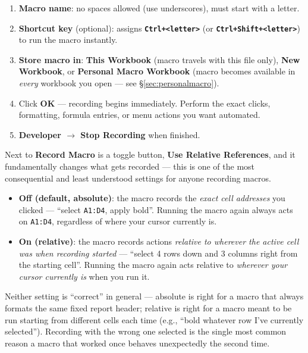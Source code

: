 \documentclass[11pt,a4paper]{article}
\newcommand{\key}[1]{\texttt{\colorbox{black!8}{\textbf{#1}}}}
\begin{document}
\begin{formulasyntax}
\begin{enumerate}
  \item \textbf{Macro name}: no spaces allowed (use underscores), must start with a letter.
  \item \textbf{Shortcut key} (optional): assigns \key{Ctrl+\textless letter\textgreater} (or \key{Ctrl+Shift+\textless letter\textgreater}) to run the macro instantly.
  \item \textbf{Store macro in}: \textbf{This Workbook} (macro travels with this file only), \textbf{New Workbook}, or \textbf{Personal Macro Workbook} (macro becomes available in \emph{every} workbook you open --- see \S\ref{sec:personalmacro}).
  \item Click \textbf{OK} --- recording begins immediately. Perform the exact clicks, formatting, formula entries, or menu actions you want automated.
  \item \textbf{Developer $\rightarrow$ Stop Recording} when finished.
\end{enumerate}
\end{formulasyntax}

\begin{pitfall}
Next to \textbf{Record Macro} is a toggle button, \textbf{Use Relative References}, and it fundamentally changes what gets recorded --- this is one of the most consequential and least understood settings for anyone recording macros.
\begin{itemize}
  \item \textbf{Off (default, absolute)}: the macro records the \emph{exact cell addresses} you clicked --- ``select \texttt{A1:D4}, apply bold''. Running the macro again always acts on \texttt{A1:D4}, regardless of where your cursor currently is.
  \item \textbf{On (relative)}: the macro records actions \emph{relative to wherever the active cell was when recording started} --- ``select 4 rows down and 3 columns right from the starting cell''. Running the macro again acts relative to \emph{wherever your cursor currently is} when you run it.
\end{itemize}
Neither setting is ``correct'' in general --- absolute is right for a macro that always formats the same fixed report header; relative is right for a macro meant to be run starting from different cells each time (e.g., ``bold whatever row I've currently selected''). Recording with the wrong one selected is the single most common reason a macro that worked once behaves unexpectedly the second time.
\end{pitfall}
\end{document}
